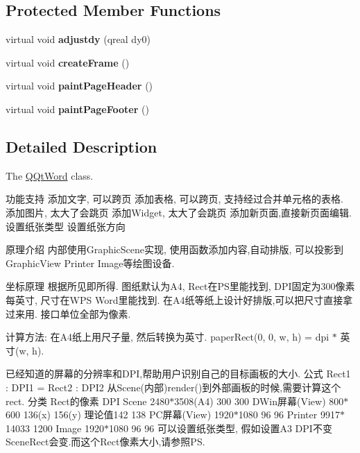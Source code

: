 \subsection*{Protected Member Functions}
\begin{DoxyCompactItemize}
\item 
\mbox{\label{class_q_qt_word_a6572e8ac3de1162e56422b252320d398}} 
virtual void {\bfseries adjustdy} (qreal dy0)
\item 
\mbox{\label{class_q_qt_word_a8e6709d01e1a038cd40fc730ed13ceb3}} 
virtual void {\bfseries create\+Frame} ()
\item 
\mbox{\label{class_q_qt_word_a4ef7332758334890f0fe14d34261c07a}} 
virtual void {\bfseries paint\+Page\+Header} ()
\item 
\mbox{\label{class_q_qt_word_a15ecec3665706f32c366826ef588142f}} 
virtual void {\bfseries paint\+Page\+Footer} ()
\end{DoxyCompactItemize}


\subsection{Detailed Description}
The \mbox{\hyperlink{class_q_qt_word}{Q\+Qt\+Word}} class. 

功能支持 添加文字, 可以跨页 添加表格, 可以跨页, 支持经过合并单元格的表格. 添加图片, 太大了会跳页 添加\+Widget, 太大了会跳页 添加新页面,直接新页面编辑. 设置纸张类型 设置纸张方向

原理介绍 内部使用\+Graphic\+Scene实现, 使用函数添加内容,自动排版, 可以投影到\+Graphic\+View Printer Image等绘图设备.

坐标原理 根据所见即所得. 图纸默认为\+A4, Rect在\+P\+S里能找到, D\+P\+I固定为300像素每英寸, 尺寸在\+W\+PS Word里能找到. 在\+A4纸等纸上设计好排版,可以把尺寸直接拿过来用. 接口单位全部为像素.

计算方法\+: 在\+A4纸上用尺子量, 然后转换为英寸. paper\+Rect(0, 0, w, h) = dpi $\ast$ 英寸(w, h).

已经知道的屏幕的分辨率和\+D\+PI,帮助用户识别自己的目标画板的大小. 公式 Rect1 \+: D\+P\+I1 = Rect2 \+: D\+P\+I2 从\+Scene(内部)render()到外部画板的时候,需要计算这个rect. 分类 Rect的像素 D\+PI Scene 2480$\ast$3508(A4) 300 300 D\+Win屏幕(\+View) 800$\ast$600 136(x) 156(y) 理论值142 138 P\+C屏幕(\+View) 1920$\ast$1080 96 96 Printer 9917$\ast$14033 1200 Image 1920$\ast$1080 96 96 可以设置纸张类型, 假如设置\+A3 D\+P\+I不变 Scene\+Rect会变.\+而这个\+Rect像素大小,请参照\+PS.


